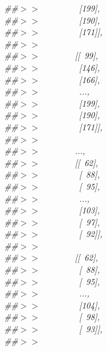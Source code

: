 \mbox{}\textit{\#\#$>$$>$\ \ \ \ \ \ \ \ \ [199],} \\
\mbox{}\textit{\#\#$>$$>$\ \ \ \ \ \ \ \ \ [190],} \\
\mbox{}\textit{\#\#$>$$>$\ \ \ \ \ \ \ \ \ [171]],} \\
\mbox{}\textit{\#\#$>$$>$\ } \\
\mbox{}\textit{\#\#$>$$>$\ \ \ \ \ \ \ \ [[\ 99],} \\
\mbox{}\textit{\#\#$>$$>$\ \ \ \ \ \ \ \ \ [146],} \\
\mbox{}\textit{\#\#$>$$>$\ \ \ \ \ \ \ \ \ [166],} \\
\mbox{}\textit{\#\#$>$$>$\ \ \ \ \ \ \ \ \ ...,\ } \\
\mbox{}\textit{\#\#$>$$>$\ \ \ \ \ \ \ \ \ [199],} \\
\mbox{}\textit{\#\#$>$$>$\ \ \ \ \ \ \ \ \ [190],} \\
\mbox{}\textit{\#\#$>$$>$\ \ \ \ \ \ \ \ \ [171]],} \\
\mbox{}\textit{\#\#$>$$>$\ } \\
\mbox{}\textit{\#\#$>$$>$\ \ \ \ \ \ \ \ ...,\ } \\
\mbox{}\textit{\#\#$>$$>$\ \ \ \ \ \ \ \ [[\ 62],} \\
\mbox{}\textit{\#\#$>$$>$\ \ \ \ \ \ \ \ \ [\ 88],} \\
\mbox{}\textit{\#\#$>$$>$\ \ \ \ \ \ \ \ \ [\ 95],} \\
\mbox{}\textit{\#\#$>$$>$\ \ \ \ \ \ \ \ \ ...,\ } \\
\mbox{}\textit{\#\#$>$$>$\ \ \ \ \ \ \ \ \ [103],} \\
\mbox{}\textit{\#\#$>$$>$\ \ \ \ \ \ \ \ \ [\ 97],} \\
\mbox{}\textit{\#\#$>$$>$\ \ \ \ \ \ \ \ \ [\ 92]],} \\
\mbox{}\textit{\#\#$>$$>$\ } \\
\mbox{}\textit{\#\#$>$$>$\ \ \ \ \ \ \ \ [[\ 62],} \\
\mbox{}\textit{\#\#$>$$>$\ \ \ \ \ \ \ \ \ [\ 88],} \\
\mbox{}\textit{\#\#$>$$>$\ \ \ \ \ \ \ \ \ [\ 95],} \\
\mbox{}\textit{\#\#$>$$>$\ \ \ \ \ \ \ \ \ ...,\ } \\
\mbox{}\textit{\#\#$>$$>$\ \ \ \ \ \ \ \ \ [104],} \\
\mbox{}\textit{\#\#$>$$>$\ \ \ \ \ \ \ \ \ [\ 98],} \\
\mbox{}\textit{\#\#$>$$>$\ \ \ \ \ \ \ \ \ [\ 93]],} \\
\mbox{}\textit{\#\#$>$$>$\ } \\
